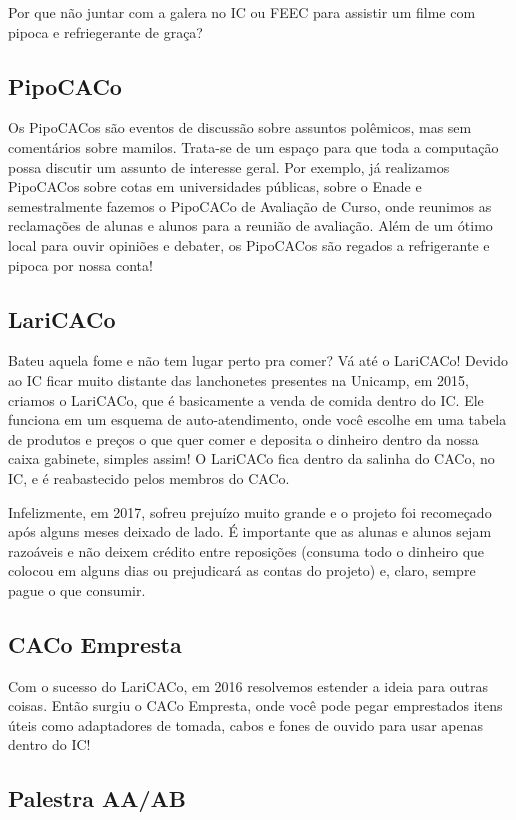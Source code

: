 Por que não juntar com a galera no IC ou FEEC para assistir um filme com pipoca
e refriegerante de graça?

\subsection{PipoCACo}

Os PipoCACos são eventos de discussão sobre assuntos polêmicos, mas sem
comentários sobre mamilos. Trata-se de um espaço para que toda a computação
possa discutir um assunto de interesse geral. Por exemplo, já realizamos
PipoCACos sobre cotas em universidades públicas, sobre o Enade e semestralmente
fazemos o PipoCACo de Avaliação de Curso, onde reunimos as reclamações de
alunas e alunos para a reunião de avaliação. Além de um ótimo local para ouvir
opiniões e debater, os PipoCACos são regados a refrigerante e pipoca por nossa
conta!

\subsection{LariCACo}

Bateu aquela fome e não tem lugar perto pra comer? Vá até o LariCACo! Devido ao
IC ficar muito distante das lanchonetes presentes na Unicamp, em 2015, criamos
o LariCACo, que é basicamente a venda de comida dentro do IC. Ele funciona em
um esquema de auto-atendimento, onde você escolhe em uma tabela de produtos e
preços o que quer comer e deposita o dinheiro dentro da nossa caixa gabinete,
simples assim! O LariCACo fica dentro da salinha do CACo, no IC, e é
reabastecido pelos membros do CACo.

Infelizmente, em 2017, sofreu prejuízo muito grande e o projeto foi recomeçado
após alguns meses deixado de lado. É importante que as alunas e alunos sejam
razoáveis e não deixem crédito entre reposições (consuma todo o dinheiro que
colocou em alguns dias ou prejudicará as contas do projeto) e, claro, sempre
pague o que consumir.

\subsection{CACo Empresta}

Com o sucesso do LariCACo, em 2016 resolvemos estender a ideia para outras
coisas. Então surgiu o CACo Empresta, onde você pode pegar emprestados itens
úteis como adaptadores de tomada, cabos e fones de ouvido para usar apenas
dentro do IC!

\subsection{Palestra AA/AB}

